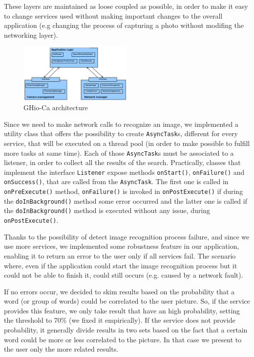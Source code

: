 These layers are maintained as loose coupled as possible, in order to make it easy to change services used without making important changes to the overall application (e.g changing the process of capturing a photo without modifing the networking layer).

\begin{figure}[h]
    \centering
    \includegraphics[width=0.50\textwidth]{../img/ghioca_macro_component}
    \caption{GHio-Ca architecture}
    \label{fig:architecture}
\end{figure}

Since we need to make network calls to recognize an image, we implemented a utility class that offers the possibility to create \texttt{AsyncTask}s, different for every service, that will be executed on a thread pool (in order to make possible to fulfill more tasks at same time). Each of those \texttt{AsyncTask}s must be associated to a listener, in order to collect all the results of the search. Practically, classes that implement the interface \texttt{Listener} expose methods \texttt{onStart()}, \texttt{onFailure()} and \texttt{onSuccess()}, that are called from the \texttt{AsyncTask}. The first one is called in \texttt{onPreExecute()} method, \texttt{onFailure()} is invoked in \texttt{onPostExecute()} if during the \texttt{doInBackground()} method some error occurred and the latter one is called if the \texttt{doInBackground()} method is executed without any issue, during \texttt{onPostExecute()}.

Thanks to the possibility of detect image recognition process failure, and since we use more services, we implemented some robustness feature in our application, enabling it to return an error to the user only if all services fail. The scenario where, even if the application could start the image recognition process but it could not be able to finish it, could still occurs (e.g. caused by a network fault).

If no errors occur, we decided to skim results based on the probability that a word (or group of words) could be correlated to the user picture. So, if the service provides this feature, we only take result that have an high probability, setting the threshold to 70\% (we fixed it empirically). If the service does not provide probability, it generally divide results in two sets based on the fact that a 
certain word could be more or less correlated to the picture. In that case we present to the user only the more related results.

